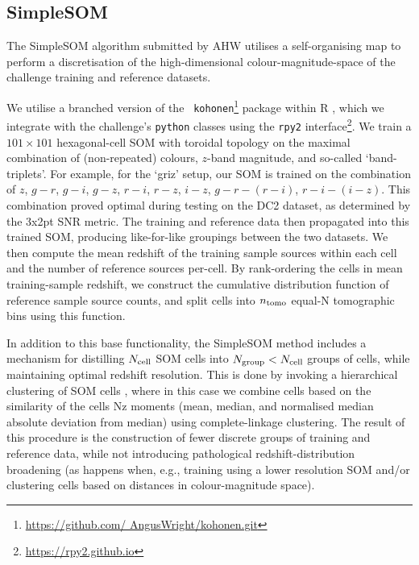 \documentclass[twocolumn,twocolappendix]{aastex63}
\begin{document}
\subsection{ {\sc SimpleSOM} }
The SimpleSOM algorithm submitted by AHW utilises a self-organising map
\citep[SOM,][]{Kohonen:1982} to perform  a discretisation of the
high-dimensional colour-magnitude-space of the challenge training and reference
datasets. 

We utilise a branched version of the {\tt
kohonen}\footnote{\url{https://github.com/ AngusWright/kohonen.git}} package
\citep{Wright/etal:2020b, Wehrens/Kruisselbrink:2018, Wehrens/Lutgarde:2007}
within R \citep{R}, which we integrate with  the challenge's {\tt python}
classes using the {\tt rpy2} interface\footnote{\url{https://rpy2.github.io}}. 
We train a $101 \times 101$ hexagonal-cell SOM with toroidal topology on the
maximal combination of (non-repeated) colours, $z$-band magnitude, and so-called
`band-triplets'. For example, for the `griz' setup, our SOM is trained on the
combination of  $z$, $g-r$, $g-i$, $g-z$, $r-i$, $r-z$, $i-z$, $g-r-(r-i)$,
$r-i-(i-z)$. This combination proved optimal during testing on the DC2 dataset,
as determined by the 3x2pt SNR metric. The training and reference data then
propagated into this trained SOM, producing like-for-like groupings between the
two datasets. We then compute the mean redshift of the training sample sources
within each cell and the number of reference sources per-cell. By rank-ordering
the cells in mean training-sample redshift, we construct the cumulative
distribution function of reference sample source counts, and split cells into
${n_{\rm tomo}}$ equal-N tomographic bins using this function. 

In addition to this base functionality, the SimpleSOM method includes a
mechanism for distilling $N_{\rm cell}$ SOM cells into $N_{\rm group}<N_{\rm
cell}$ groups of cells, while maintaining optimal redshift resolution. This is
done by invoking a hierarchical clustering of SOM cells \citep[see Appendix B of
][]{Wright/etal:2020a}, where in this case we combine cells based on the
similarity of the cells Nz moments (mean, median, and normalised median absolute
deviation from median) using complete-linkage clustering. The result of this
procedure is the construction of fewer discrete groups of training and reference
data, while not introducing pathological redshift-distribution broadening (as
happens when, e.g., training using a lower resolution SOM and/or clustering
cells based on distances in colour-magnitude space). 
\end{document}
